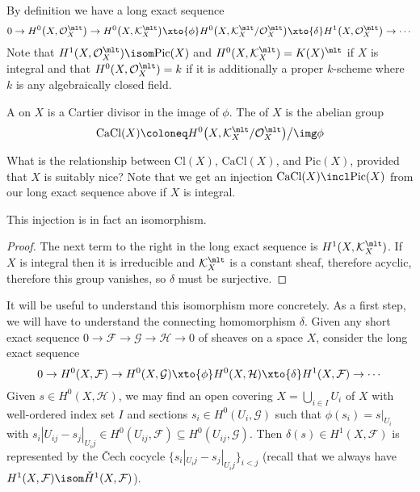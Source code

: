 \documentclass[wip, algebra]{bsteffan-lecturenotes}
\newcommand{\cO}{\mathcal{O}}
\newcommand{\cF}{\mathcal{F}}
\newcommand{\cG}{\mathcal{G}}
\newcommand{\cH}{\mathcal{H}}
\newcommand{\cK}{\mathcal{K}}
\newcommand{\Pic}{\mathrm{Pic}}
\newcommand{\Cl}{\mathrm{Cl}}
\newcommand{\CaCl}{\mathrm{CaCl}}
\begin{document}
By definition we have a long exact sequence
\begin{equation*}
	0 \to H^0\big(X, \cO_X^\mlt\big) \to H^0\big(X, \cK_X^\mlt\big) \xto{\phi} H^0\big(X, \cK_X^\mlt / \cO_X^\mlt\big) \xto{\delta} H^1\big(X, \cO_X^\mlt\big) \to \cdots
\end{equation*}
Note that $H^1(X, \cO_X^\mlt) \isom \Pic(X)$ and $H^0(X, \cK_X^\mlt) = K(X)^\mlt$ if $X$ is integral and that $H^0(X, \cO_X^\mlt) = k$ if it is additionally a proper $k$-scheme where $k$ is any algebraically closed field.
\begin{definition}
	A  on $X$ is a Cartier divisor in the image of $\phi$.
	The  of $X$ is the abelian group
	\begin{equation*}
		\CaCl(X) \coloneq H^0\big(X, \cK_X^\mlt / \cO_X^\mlt\big) \big/ \img \phi
	\end{equation*}
\end{definition}
What is the relationship between $\Cl(X)$, $\CaCl(X)$, and $\Pic(X)$, provided that $X$ is suitably nice? 
Note that we get an injection $\CaCl(X) \incl \Pic(X)$ from our long exact sequence above if $X$ is integral.
\begin{proposition}
	This injection is in fact an isomorphism.
\end{proposition}
\begin{proof}
	The next term to the right in the long exact sequence is $H^1(X, \cK_X^\mlt)$.
	If $X$ is integral then it is irreducible and $\cK_X^\mlt$ is a constant sheaf, therefore acyclic, therefore this group vanishes, so $\delta$ must be surjective.
\end{proof}
It will be useful to understand this isomorphism more concretely.
As a first step, we will have to understand the connecting homomorphism $\delta$.
Given any short exact sequence $0 \to \cF \to \cG \to \cH \to 0$ of sheaves on a space $X$, consider the long exact sequence 
\begin{equation*}
	0 \to H^0(X, \cF) \to H^0(X, \cG) \xto{\phi} H^0(X, \cH) \xto{\delta} H^1(X, \cF) \to \cdots
\end{equation*}
Given $s \in H^0(X, \cH)$, we may find an open covering $X = \bigcup_{i \in I} U_i$ of $X$ with well-ordered index set $I$ and sections $s_i \in H^0(U_i, \cG)$ such that $\phi(s_i) = s|_{U_i}$ with $s_i|U_{ij} - s_j|_{U_ij} \in H^0(U_{ij}, \cF) \subseteq H^0(U_{ij}, \cG)$.
Then $\delta(s) \in H^1(X, \cF)$ is represented by the Čech cocycle $\{s_i|_{U_ij} - s_j|_{U_ij}\}_{i < j}$ (recall that we always have $H^1(X, \cF) \isom \check{H}^1(X, \cF)$).
\end{document}
